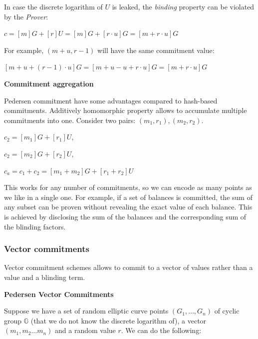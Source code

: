 \documentclass[../lecture-notes.tex]{subfiles}
\begin{document}
\begin{remark}
    In case the discrete logarithm of $U$ is leaked, the \textit{binding} property can be violated by the \textit{Prover}:

    \begin{center}
        $c = [m]G + [r]U = [m] G + [r \cdot u]G = [m + r \cdot u] G$
    \end{center}

    For example, $(m + u, r - 1)$ will have the same commitment value:

    \begin{center}
        $[m+u + (r-1) \cdot u] G = [m + u - u + r \cdot u] G = [m + r \cdot u] G$     
    \end{center}
    
        
\end{remark}

\textbf{Commitment aggregation}

Pedersen commitment have some advantages compared to hash-based commitments.
Additively homomorphic property allows to accumulate multiple commitments into one.
Consider two pairs: $(m_1, r_1), (m_2, r_2)$.

\begin{center}
    $c_2 = [m_1]G + [r_1]U$,

    $c_2 = [m_2]G + [r_2]U$,

    $c_a = c_1 + c_2 = [m_1 + m_2]G + [r_1 + r_2]U$
\end{center}

This works for any number of commitments, so we can encode as many points as we like in a single one.
For example, if a set of balances is committed, the sum of any subset can be proven without revealing the exact value of each balance. 
This is achieved by disclosing the sum of the balances and the corresponding sum of the blinding factors.

\subsubsection{Vector commitments}

Vector commitment schemes allows to commit to a vector of values rather than a value and a blinding term.

\textbf{Pedersen Vector Commitments}

Suppose we have a set of random elliptic curve points $(G_1, \ldots ,G_n)$ of cyclic group $\mathbb{G}$ 
(that we do not know the discrete logarithm of), a vector $(m_1, m_2 \ldots m_n)$ and a random value $r$. We can do the following:
\end{document}
